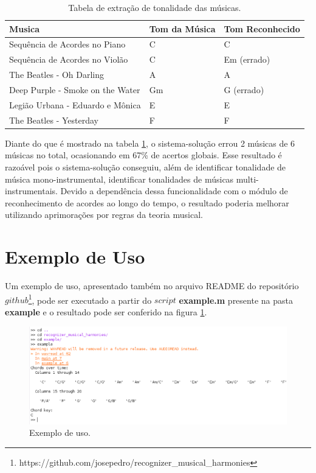 \begin{table}[h]
\centering
\begin{tabular}{|l|l|l|}
\hline
Musica                           & Tom da Música & Tom Reconhecido \\ \hline
Sequência de Acordes no Piano    & C             & C               \\ \hline
Sequência de Acordes no Violão   & C             & Em (errado)     \\ \hline
The Beatles - Oh Darling         & A             & A               \\ \hline
Deep Purple - Smoke on the Water & Gm            & G (errado)      \\ \hline
Legião Urbana - Eduardo e Mônica & E             & E               \\ \hline
The Beatles - Yesterday          & F             & F               \\ \hline
\end{tabular}
\caption{Tabela de extração de tonalidade das músicas.}
\label{tab:tons}
\end{table}

Diante do que é mostrado na tabela \ref{tab:tons}, o sistema-solução errou 2 músicas de 6 músicas no total, ocasionando em 67\% de acertos globais. Esse resultado é razoável pois o sistema-solução conseguiu, além de identificar tonalidade de música mono-instrumental, identificar tonalidades de músicas multi-instrumentais. Devido a dependência dessa funcionalidade com o módulo de reconhecimento de acordes ao longo do tempo, o resultado poderia melhorar utilizando aprimorações por regras da teoria musical.

\section{Exemplo de Uso}
\label{sec:exemplo_uso}

Um exemplo de uso, apresentado também no arquivo README do repositório $github$\footnote{https://github.com/josepedro/recognizer\_musical\_harmonies}, pode ser executado a partir do $script$ \textbf{example.m} presente na pasta \textbf{example} e o resultado pode ser conferido na figura \ref{fig:exemplo_uso}.

\begin{figure}[h] 
  \centering
    \includegraphics[keepaspectratio=true, scale=0.4]{figuras/exemplo_uso}
    \caption{Exemplo de uso.}
    \label{fig:exemplo_uso}
\end{figure}

